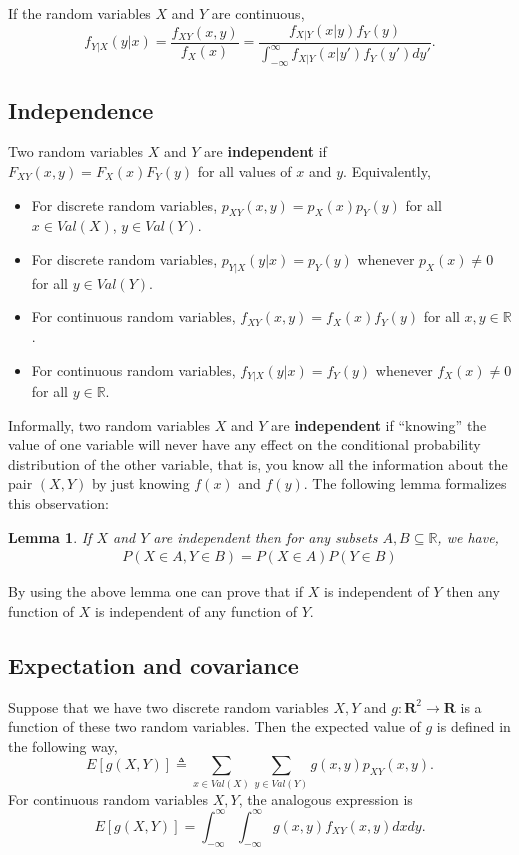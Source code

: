 \documentclass{article}
\newtheorem{lem}[thm]{Lemma}
\begin{document}
If the random variables $X$ and $Y$ are continuous,
\begin{equation*}
f_{Y|X}(y|x)=\frac{f_{XY}(x,y)}{f_X(x)}=\frac{f_{X|Y}(x|y)f_Y(y)}{\int_{-\infty}^{\infty} f_{X|Y}(x|y')f_Y(y')dy'}.
\end{equation*}

\subsection{Independence}

Two random variables $X$ and $Y$ are \textbf{independent} if $F_{XY}(x,y) = F_X(x) F_Y(y)$ for all values of 
$x$ and $y$.  Equivalently,
\begin{itemize}
\item For discrete random variables, $p_{XY}(x,y) = p_X(x) p_Y(y)$ for all $x \in Val(X)$, $y \in Val(Y)$.
\item For discrete random variables, $p_{Y|X}(y|x) = p_Y(y)$ whenever $p_X(x) \neq 0$ for all $y \in Val(Y)$.
\item For continuous random variables, $f_{XY}(x,y) = f_X(x) f_Y(y)$ for all $x,y \in \mathbb{R}$.
\item For continuous random variables, $f_{Y|X}(y|x) = f_Y(y)$ whenever $f_X(x) \neq 0$ for all $y \in \mathbb{R}$.
\end{itemize}

Informally, two random variables $X$ and $Y$ are \textbf{independent}
if ``knowing'' the value of one variable will never have any effect on
the conditional probability distribution of the other variable, that
is, you know all the information about the pair $(X,Y)$ by just
knowing $f(x)$ and $f(y)$. The following lemma formalizes this
observation:
\begin{lem}
If $X$ and $Y$ are independent then for any subsets $A, B \subseteq \mathbb{R}$, we have,
\begin{eqnarray*}
P(X \in A, Y \in B)=P(X \in A) P(Y \in B)
\end{eqnarray*}
\end{lem}
By using the above lemma one can prove that if $X$ is independent of $Y$ then any function of $X$ is independent of any function of $Y$.

\subsection{Expectation and covariance}

Suppose that we have two discrete random variables $X, Y$ and $g: \mathbf{R}^2 \longrightarrow \mathbf{R}$ is a function of these two random variables. Then the expected value of $g$ is defined in the following way,
\begin{equation*}
  E[g(X,Y)] \triangleq \sum_{x \in Val(X)} \sum_{y \in Val(Y)} g(x,y) p_{XY}(x,y).
\end{equation*}
For continuous random variables $X,Y$, the analogous expression is
\begin{equation*}
E[g(X,Y)]= \int_{-\infty}^{\infty} \int_{- \infty}^{\infty} g(x,y) f_{XY}(x,y) dxdy.
\end{equation*}
\end{document}
